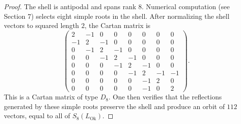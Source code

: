 \documentclass[10pt,a4paper]{amsart}
\newcommand{\LOk}{L_{\mathrm{Ok}}}
\begin{document}
\begin{proof}
The shell is antipodal and spans rank \(8\). Numerical computation (see Section 7)
selects eight simple roots in the shell. After normalizing the shell vectors
to squared length \(2\), the Cartan matrix is
\begin{equation}
\begin{pmatrix}
2&-1&0&0&0&0&0&0\\
-1&2&-1&0&0&0&0&0\\
0&-1&2&-1&0&0&0&0\\
0&0&-1&2&-1&0&0&0\\
0&0&0&-1&2&-1&0&0\\
0&0&0&0&-1&2&-1&-1\\
0&0&0&0&0&-1&2&0\\
0&0&0&0&0&-1&0&2
\end{pmatrix}.
\end{equation}
This is a Cartan matrix of type \(D_8\). One then verifies
that the reflections generated by these simple roots preserve the shell and
produce an orbit of \(112\) vectors, equal to all of \(S_8(\LOk)\).
\end{proof}
\end{document}
